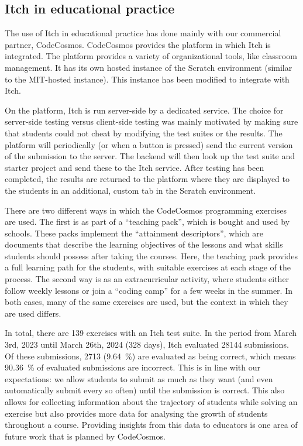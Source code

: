 \documentclass[../main]{subfiles}
\begin{document}
\subsection{Itch in educational practice}\label{subsec:itch-in-educational-practice}

The use of Itch in educational practice has done mainly with our commercial partner, CodeCosmos.
CodeCosmos provides the platform in which Itch is integrated.
The platform provides a variety of organizational tools, like classroom management.
It has its own hosted instance of the Scratch environment (similar to the MIT-hosted instance).
This instance has been modified to integrate with Itch.

On the platform, Itch is run server-side by a dedicated service.
The choice for server-side testing versus client-side testing was mainly motivated by making sure that students could not cheat by modifying the test suites or the results.
The platform will periodically (or when a button is pressed) send the current version of the submission to the server.
The backend will then look up the test suite and starter project and send these to the Itch service.
After testing has been completed, the results are returned to the platform where they are displayed to the students in an additional, custom tab in the Scratch environment.

There are two different ways in which the CodeCosmos programming exercises are used.
The first is as part of a ``teaching pack'', which is bought and used by schools.
These packs implement the ``attainment descriptors'', which are documents that describe the learning objectives of the lessons and what skills students should possess after taking the courses.
Here, the teaching pack provides a full learning path for the students, with suitable exercises at each stage of the process.
The second way is as an extracurricular activity, where students either follow weekly lessons or join a ``coding camp'' for a few weeks in the summer.
In both cases, many of the same exercises are used, but the context in which they are used differs.

In total, there are 139 exercises with an Itch test suite.
In the period from March 3rd, 2023 until March 26th, 2024 (328 days), Itch evaluated \num{28144} submissions.
Of these submissions, \num{2713} (\qty{9.64}{\percent}) are evaluated as being correct, which means \qty{90.36}{\percent} of evaluated submissions are incorrect.
This is in line with our expectations: we allow students to submit as much as they want (and even automatically submit every so often) until the submission is correct.
This also allows for collecting information about the trajectory of students while solving an exercise but also provides more data for analysing the growth of students throughout a course.
Providing insights from this data to educators is one area of future work that is planned by CodeCosmos.
\end{document}

